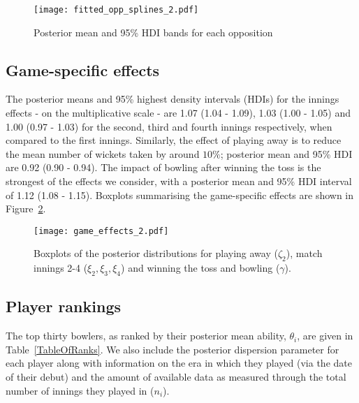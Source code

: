 \documentclass{statsoc}
\begin{document}
\begin{figure}%
    \centering
    \texttt{[image: fitted\_opp\_splines\_2.pdf]}
\caption{Posterior mean and 95\% HDI bands for each opposition} %
\label{fitted_opp_splines}
\end{figure}

\subsection{Game-specific effects}
The posterior means and 95\% highest density intervals (HDIs) for the innings effects - on the multiplicative scale - are 1.07 (1.04 - 1.09), 1.03 (1.00 - 1.05) and 1.00 (0.97 - 1.03) for the second, third and fourth innings respectively, when compared to the first innings. Similarly, the effect of playing away is to reduce the mean number of wickets taken by around $10\%$; posterior mean and 95\% HDI are 0.92 (0.90 - 0.94). The impact of bowling after winning the toss is the strongest of the effects we consider, with a posterior mean and 95\% HDI interval of 1.12 (1.08 - 1.15). Boxplots summarising the game-specific effects are shown in Figure~\ref{FigInnsHA}.

\begin{figure}%
    \centering
    \texttt{[image: game\_effects\_2.pdf]}
     \caption{Boxplots of the posterior distributions for playing away ($\zeta_2$), match innings 2-4 ($\xi_2, \xi_3, \xi_4$) and winning the toss and bowling ($\gamma$).}
     \label{FigInnsHA}
\end{figure}

\subsection{Player rankings}
The top thirty bowlers, as ranked by their posterior mean ability, $\theta_i$, are given in Table~\ref{TableOfRanks}. We also include the posterior dispersion parameter for each player along with information on the era in which they played (via the date of their debut) and the amount of available data as measured through the total number of innings they played in ($n_i$).
\end{document}
